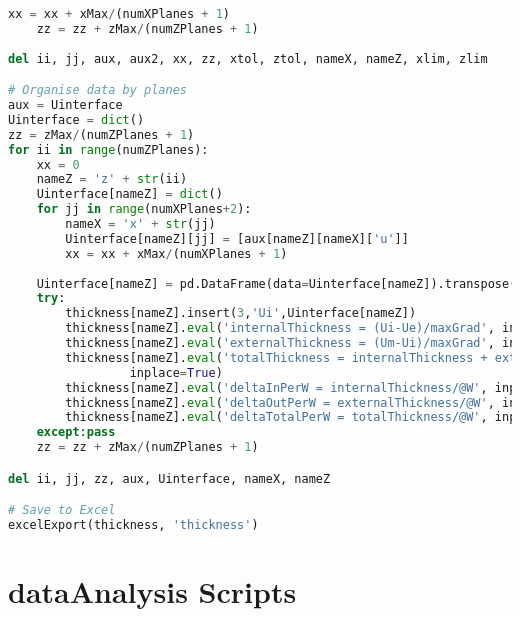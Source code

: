 \begin{lstlisting}[language=python]
        xx = xx + xMax/(numXPlanes + 1)
    zz = zz + zMax/(numZPlanes + 1)
    
del ii, jj, aux, aux2, xx, zz, xtol, ztol, nameX, nameZ, xlim, zlim

# Organise data by planes
aux = Uinterface
Uinterface = dict()
zz = zMax/(numZPlanes + 1)
for ii in range(numZPlanes):
    xx = 0
    nameZ = 'z' + str(ii)
    Uinterface[nameZ] = dict()
    for jj in range(numXPlanes+2):
        nameX = 'x' + str(jj)
        Uinterface[nameZ][jj] = [aux[nameZ][nameX]['u']]
        xx = xx + xMax/(numXPlanes + 1)
        
    Uinterface[nameZ] = pd.DataFrame(data=Uinterface[nameZ]).transpose()
    try:
        thickness[nameZ].insert(3,'Ui',Uinterface[nameZ])
        thickness[nameZ].eval('internalThickness = (Ui-Ue)/maxGrad', inplace=True)
        thickness[nameZ].eval('externalThickness = (Um-Ui)/maxGrad', inplace=True)
        thickness[nameZ].eval('totalThickness = internalThickness + externalThickness',\
                 inplace=True)
        thickness[nameZ].eval('deltaInPerW = internalThickness/@W', inplace=True)
        thickness[nameZ].eval('deltaOutPerW = externalThickness/@W', inplace=True)
        thickness[nameZ].eval('deltaTotalPerW = totalThickness/@W', inplace=True)
    except:pass
    zz = zz + zMax/(numZPlanes + 1)

del ii, jj, zz, aux, Uinterface, nameX, nameZ

# Save to Excel
excelExport(thickness, 'thickness')

\end{lstlisting}

\section{dataAnalysis Scripts}
